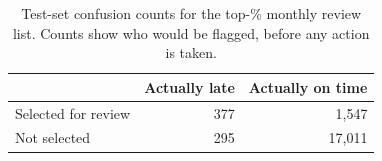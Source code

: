 \begin{table}[H]
\centering\small
\caption{Test-set confusion counts for the top-\ActShare{}\% monthly review list. Counts show who would be flagged, before any action is taken.}
\label{tab:app-confusion}
\begin{tabular}{@{}lrr@{}}
\toprule
& Actually late & Actually on time \\
\midrule
Selected for review & 377 & 1,547 \\
Not selected & 295 & 17,011 \\
\bottomrule
\end{tabular}
\end{table}